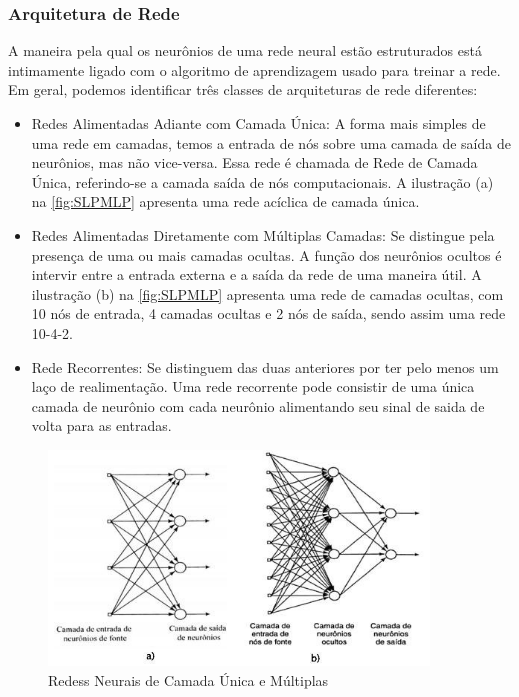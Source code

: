 \subsubsection{Arquitetura de Rede}
A maneira pela qual os neurônios de uma rede neural estão estruturados está intimamente ligado com o algoritmo de aprendizagem usado para treinar a rede. Em geral, podemos identificar três classes de arquiteturas de rede diferentes:
    \begin{itemize}
        \item Redes Alimentadas Adiante com Camada Única: A forma mais simples de uma rede em camadas, temos a entrada de nós sobre uma camada de saída de neurônios, mas não vice-versa. Essa rede é chamada de Rede de Camada Única, referindo-se a camada saída de nós computacionais. A ilustração (a) na \autoref{fig:SLPMLP} apresenta uma rede acíclica de camada única.
        \item Redes Alimentadas Diretamente com Múltiplas Camadas: Se distingue pela presença de uma ou mais camadas ocultas. A função dos neurônios ocultos é intervir entre a entrada externa e a saída da rede de uma maneira útil. A ilustração (b) na \autoref{fig:SLPMLP} apresenta uma rede de camadas ocultas, com 10 nós de entrada, 4 camadas ocultas e 2 nós de saída, sendo assim uma rede 10-4-2.
        \item Rede Recorrentes: Se distinguem das duas anteriores por ter pelo menos um laço de realimentação. Uma rede recorrente pode consistir de uma única camada de neurônio com cada neurônio alimentando seu sinal de saida de volta para as entradas.
    \end{itemize}
    
    \begin{figure}
    \centering
    \includegraphics[width=0.9\textwidth]{modelo-monografia-rej-2018/img/Figura-1-a-Rede-de-camada-unica-b-Rede-de-multiplas-camadas.png}
    \caption{Redess Neurais de Camada Única e Múltiplas}
    \label{fig:SLPMLP}
    \end{figure}

